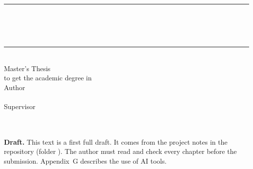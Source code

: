 \begin{titlepage}
\thispagestyle{empty}
\begin{center}
{\large\textsc{\thesisuniversity}}\\[2pt]
{\normalsize \thesisinstitute}\\[3.2cm]

{\color{seriesblue}\rule{\linewidth}{1pt}}\\[14pt]
{\LARGE\bfseries \thesistitle}\\[10pt]
{\Large \thesissubtitle}\\[10pt]
{\color{seriesblue}\rule{\linewidth}{1pt}}\\[2.2cm]

{\large Master's Thesis}\\[6pt]
{\normalsize to get the academic degree in \thesisprogram}\\[2cm]

{\normalsize Author}\\[2pt]
{\large\bfseries \thesisauthor}\\[1cm]
{\normalsize Supervisor}\\[2pt]
{\large \thesissupervisor}\\[2.5cm]

{\normalsize \thesisdate}\\[1cm]

\begin{tcolorbox}[colback=orange100,colframe=seriesorange,boxrule=0.6pt,arc=0pt,width=0.86\linewidth,fontupper=\small]
\textbf{Draft.} This text is a first full draft. It comes from the project notes in the repository  (folder ). The author must read and check every chapter before the submission. Appendix~G describes the use of AI tools.
\end{tcolorbox}
\end{center}
\end{titlepage}
